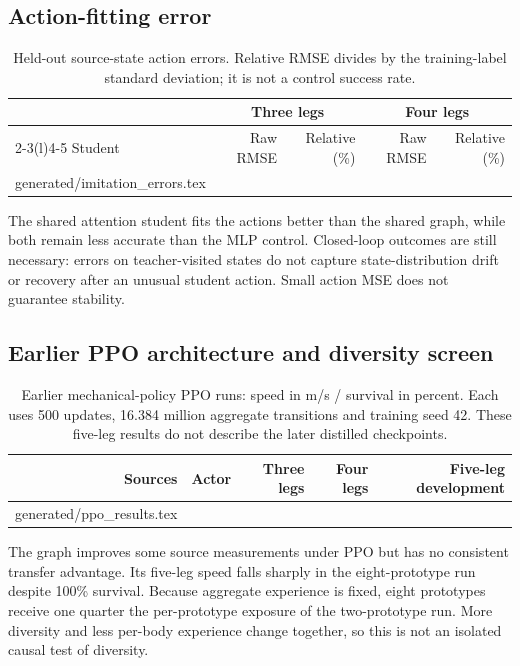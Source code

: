 \documentclass[11pt,letterpaper]{article}
\makeatletter
\newcommand{\tableinput}[1]{\@@input #1 }
\makeatother
\begin{document}
\FloatBarrier
\subsection{Action-fitting error}
\begin{table}[htbp]
\centering\small
\begin{tabular}{@{}lrrrr@{}}
\toprule
 & \multicolumn{2}{c}{Three legs} & \multicolumn{2}{c}{Four legs}\\
\cmidrule(lr){2-3}\cmidrule(l){4-5}
Student & Raw RMSE & Relative (\%) & Raw RMSE & Relative (\%)\\
\midrule
\tableinput{generated/imitation_errors.tex}
\bottomrule
\end{tabular}
\caption{Held-out source-state action errors. Relative RMSE divides by the
training-label standard deviation; it is not a control success rate.}
\end{table}

The shared attention student fits the actions better than the shared graph, while
both remain less accurate than the MLP control. Closed-loop outcomes are still
necessary: errors on teacher-visited states do not capture state-distribution
drift or recovery after an unusual student action. Small action MSE does not
guarantee stability.

\subsection{Earlier PPO architecture and diversity screen}
\begin{table}[htbp]
\centering\small
\begin{tabular}{@{}rlrrr@{}}
\toprule
Sources & Actor & Three legs & Four legs & Five-leg development\\
\midrule
\tableinput{generated/ppo_results.tex}
\bottomrule
\end{tabular}
\caption{Earlier mechanical-policy PPO runs: speed in m/s / survival in percent.
Each uses 500 updates, 16.384 million aggregate transitions and training seed 42.
These five-leg results do not describe the later distilled checkpoints.}
\label{tab:ppo}
\end{table}

The graph improves some source measurements under PPO but has no consistent
transfer advantage. Its five-leg speed falls sharply in the eight-prototype run
despite 100\% survival. Because aggregate experience is fixed, eight prototypes
receive one quarter the per-prototype exposure of the two-prototype run. More
diversity and less per-body experience change together, so this is not an
isolated causal test of diversity.
\end{document}
